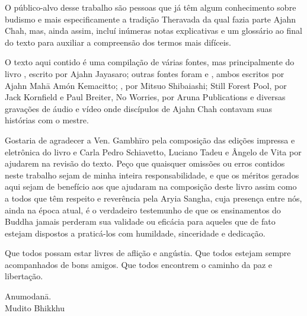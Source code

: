 O público-alvo desse trabalho são pessoas que já têm algum conhecimento
sobre budismo e mais especificamente a tradição Theravada da qual fazia
parte Ajahn Chah, mas, ainda assim, incluí inúmeras notas explicativas e
um glossário ao final do texto para auxiliar a compreensão dos termos
mais difíceis.

O texto aqui contido é uma compilação de várias fontes, mas
principalmente do livro , escrito por Ajahn Jayasaro; outras
fontes foram  e , ambos escritos por Ajahn
Mahā Amón Kemacitto; , por Mitsuo Shibaiashi;
Still Forest Pool, por Jack Kornfield e Paul Breiter, No Worries, por
Aruna Publications e diversas gravações de áudio e vídeo onde discípulos
de Ajahn Chah contavam suas histórias com o mestre.

Gostaria de agradecer a Ven. Gambhīro pela composição das edições
impressa e eletrônica do livro e Carla Pedro Schiavetto, Luciano Tadeu e
Ângelo de Vita por ajudarem na revisão do texto. Peço que quaisquer
omissões ou erros contidos neste trabalho sejam de minha inteira
responsabilidade, e que os méritos gerados aqui sejam de benefício aos
que ajudaram na composição deste livro assim como a todos que têm
respeito e reverência pela Aryia Sangha, cuja presença entre nós, ainda
na época atual, é o verdadeiro testemunho de que os ensinamentos do
Buddha jamais perderam sua validade ou eficácia para aqueles que de fato
estejam dispostos a praticá-los com humildade, sinceridade e dedicação.

Que todos possam estar livres de aflição e angústia. Que todos estejam
sempre acompanhados de bons amigos. Que todos encontrem o caminho da paz
e libertação.

{\raggedleft
Anumodanā.\\
Mudito Bhikkhu
\par}
